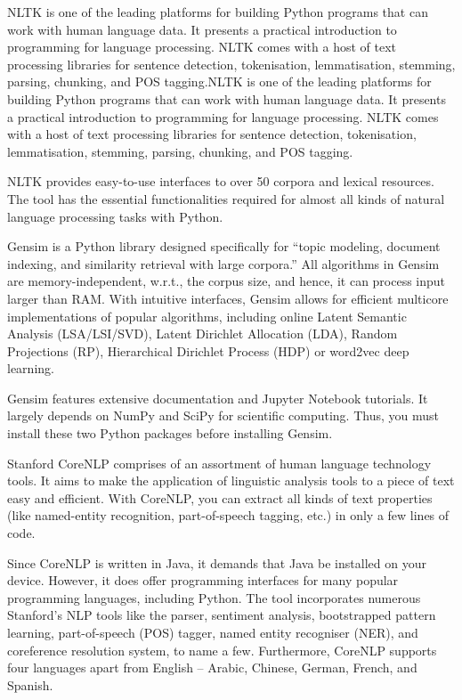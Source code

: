 	NLTK is one of the leading platforms for building Python programs that can work with human language data. It presents a practical introduction to programming for language processing. NLTK comes with a host of text processing libraries for sentence detection, tokenisation, lemmatisation, stemming, parsing, chunking, and POS tagging.NLTK is one of the leading platforms for building Python programs that can work with human language data. It presents a practical introduction to programming for language processing. NLTK comes with a host of text processing libraries for sentence detection, tokenisation, lemmatisation, stemming, parsing, chunking, and POS tagging.
	
	NLTK provides easy-to-use interfaces to over 50 corpora and lexical resources. The tool has the essential functionalities required for almost all kinds of natural language processing tasks with Python.
	
	Gensim is a Python library designed specifically for “topic modeling, document indexing, and similarity retrieval with large corpora.” All algorithms in Gensim are memory-independent, w.r.t., the corpus size, and hence, it can process input larger than RAM. With intuitive interfaces, Gensim allows for efficient multicore implementations of popular algorithms, including online Latent Semantic Analysis (LSA/LSI/SVD), Latent Dirichlet Allocation (LDA), Random Projections (RP), Hierarchical Dirichlet Process (HDP) or word2vec deep learning. 
	
	Gensim features extensive documentation and Jupyter Notebook tutorials. It largely depends on NumPy and SciPy for scientific computing. Thus, you must install these two Python packages before installing 
	Gensim.
	
	Stanford CoreNLP comprises of an assortment of human language technology tools. It aims to make the application of linguistic analysis tools to a piece of text easy and efficient. With CoreNLP, you can extract all kinds of text properties (like named-entity recognition, part-of-speech tagging, etc.) in only a few lines of code. 
	
	Since CoreNLP is written in Java, it demands that Java be installed on your device. However, it does offer programming interfaces for many popular programming languages, including Python. The tool incorporates numerous Stanford’s NLP tools like the parser, sentiment analysis, bootstrapped pattern learning, part-of-speech (POS) tagger, named entity recogniser (NER), and coreference resolution system, to name a few. Furthermore, CoreNLP supports four languages apart from English – Arabic, Chinese, German, French, and Spanish.
	
